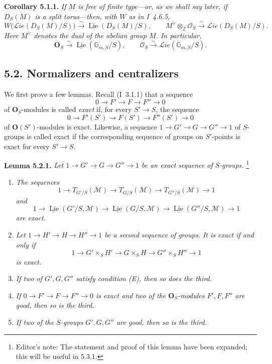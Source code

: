 \medskip
\noindent\textbf{Corollary 5.1.1.}
\textit{If \(M\) is free of finite type---or, as we shall say later,
if \(D_S(M)\) is a split torus---then, with \(W\) as in I~4.6.5,}
\[
 W\bigl(\mathscr Lie(D_S(M)/S)\bigr)
   \xrightarrow{\sim}\underline{\operatorname{Lie}}(D_S(M)/S),
 \qquad
 M^\vee\otimes_{\mathbb Z}\mathscr O_S
   \xrightarrow{\sim}\mathscr Lie(D_S(M)/S).
\]
\textit{Here \(M^\vee\) denotes the dual of the abelian group \(M\).
In particular,}
\[
 \mathbf O_S\xrightarrow{\sim}
   \underline{\operatorname{Lie}}(\mathbb G_{m,S}/S),
 \qquad
 \mathscr O_S\xrightarrow{\sim}
   \mathscr Lie(\mathbb G_{m,S}/S).
\]

\subsection*{5.2. Normalizers and centralizers}

We first prove a few lemmas. Recall (I~3.1.1) that a sequence
\[
 0\longrightarrow F'\longrightarrow F\longrightarrow F''\longrightarrow0
\]
of \(\mathbf O_S\)-modules is called \emph{exact} if, for every
\(S'\to S\), the sequence
\[
 0\longrightarrow F'(S')\longrightarrow F(S')
  \longrightarrow F''(S')\longrightarrow0
\]
of \(\mathbf O(S')\)-modules is exact. Likewise, a sequence
\(1\to G'\to G\to G''\to1\) of \(S\)-groups is called exact if the
corresponding sequence of groups on \(S'\)-points is exact for every
\(S'\to S\).

\medskip
\noindent\textbf{Lemma 5.2.1.}
\textit{Let \(1\to G'\to G\to G''\to1\) be an exact sequence of
\(S\)-groups.}
\footnote{Editor's note: The statement and proof of this lemma have
been expanded; this will be useful in 5.3.1.}
\begin{enumerate}
\renewcommand{\labelenumi}{(\roman{enumi})}
\item \textit{The sequences}
\[
 1\longrightarrow T_{G'/S}(\mathscr M)
 \longrightarrow T_{G/S}(\mathscr M)
 \longrightarrow T_{G''/S}(\mathscr M)\longrightarrow1
\]
\textit{and}
\[
 1\longrightarrow\underline{\operatorname{Lie}}(G'/S,\mathscr M)
 \longrightarrow\underline{\operatorname{Lie}}(G/S,\mathscr M)
 \longrightarrow\underline{\operatorname{Lie}}(G''/S,\mathscr M)
 \longrightarrow1
\]
\textit{are exact.}
\item \textit{Let \(1\to H'\to H\to H''\to1\) be a second sequence
of groups. It is exact if and only if}
\[
 1\longrightarrow G'\times_S H'
 \longrightarrow G\times_S H
 \longrightarrow G''\times_S H''\longrightarrow1
\]
\textit{is exact.}
\item \textit{If two of \(G',G,G''\) satisfy condition (E), then so
does the third.}
\item \textit{If \(0\to F'\to F\to F''\to0\) is exact and two of the
\(\mathbf O_S\)-modules \(F',F,F''\) are good, then so is the third.}
\item \textit{If two of the \(S\)-groups \(G',G,G''\) are good, then
so is the third.}
\end{enumerate}

